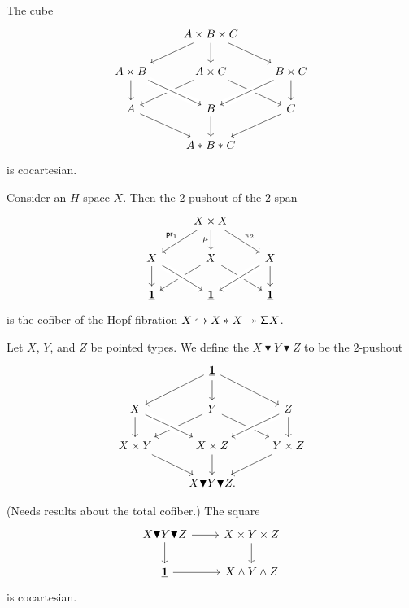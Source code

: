 \begin{cor}
The cube
\begin{equation*}
\begin{tikzcd}
& A\times B \times C \arrow[dl] \arrow[d] \arrow[dr] \\
A\times B \arrow[d] & A\times C \arrow[dl] \arrow[dr] & B\times C \arrow[dl,crossing over] \arrow[d] \\
A \arrow[dr] & B \arrow[d] \arrow[from=ul,crossing over] & C  \arrow[dl] \\
& \join{A}{\join{B}{C}}
\end{tikzcd}
\end{equation*}
is cocartesian.
\end{cor}

\begin{cor}
Consider an $H$-space $X$. Then the $2$-pushout of the $2$-span
\begin{equation*}
\begin{tikzcd}
& X \times X \arrow[dl,swap,"\proj 1"] \arrow[d,swap,"\mu"] \arrow[dr,"\pi_2"] \\
X \arrow[d] & X \arrow[dl] \arrow[dr] & X \arrow[dl,crossing over] \arrow[d] \\
\unit & \unit \arrow[from=ul,crossing over] & \unit
\end{tikzcd}
\end{equation*}
is the cofiber of the Hopf fibration $X \hookrightarrow {X}\ast_{}{X} \twoheadrightarrow \mathsf{\Sigma}^{} X$. 
\end{cor}

\begin{defn}
Let $X$, $Y$, and $Z$ be pointed types. We define the  $X\blacktriangledown Y\blacktriangledown Z$ to be the $2$-pushout
\begin{equation*}
\begin{tikzcd}
& \unit \arrow[dl] \arrow[d] \arrow[dr] \\
X \arrow[d] & Y \arrow[dl] \arrow[dr] & Z \arrow[d] \\
X\times Y \arrow[dr] & X\times Z \arrow[d] \arrow[from=ul,crossing over] \arrow[from=ur,crossing over] & Y\times Z \arrow[dl] \\
& X\blacktriangledown Y\blacktriangledown Z.
\end{tikzcd}
\end{equation*}
\end{defn}

\begin{thm}
(Needs results about the total cofiber.) The square
\begin{equation*}
\begin{tikzcd}
X\blacktriangledown Y\blacktriangledown Z \arrow[r] \arrow[d] & X\times Y\times Z \arrow[d] \\
\unit \arrow[r] & X\wedge Y\wedge Z
\end{tikzcd}
\end{equation*}
is cocartesian.
\end{thm}

